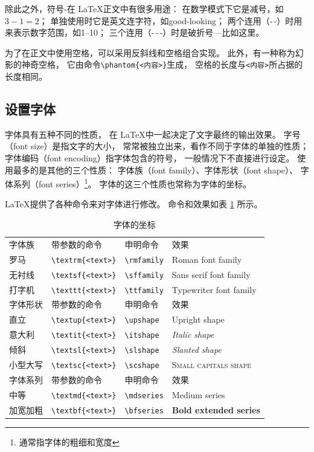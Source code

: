 \documentclass{ctexart}
\numberwithin{equation}{section}			%
\begin{document}
	除此之外，符号-在 \LaTeX 正文中有很多用途：
	在数学模式下它是减号，如$3-1=2$；
	单独使用时它是英文连字符，如good-looking；
	两个连用（-\,-）时用来表示数字范围，如1--10；
	三个连用（-\,-\,-）时是破折号---比如这里。
	
	为了在正文中使用空格，可以采用反斜线和空格组合实现。
	此外，有一种称为幻影的神奇空格，
	它由命令\verb|\phantom{<内容>}|生成，
	空格的长度与\verb|<内容>|所占据的长度相同。
	
	\subsection{设置字体}
	字体具有五种不同的性质，
	在 \LaTeX 中一起决定了文字最终的输出效果。
	字号（font size）是指文字的大小，
	常常被独立出来，看作不同于字体的单独的性质；
	字体编码（font encoding）指字体包含的符号，
	一般情况下不直接进行设定。
	使用最多的是其他的三个性质：
	字体族（font family）、字体形状（font shape）、
	字体系列（font series）\footnote{通常指字体的粗细和宽度}。
	字体的这三个性质也常称为字体的坐标。
	
	\LaTeX 提供了各种命令来对字体进行修改。
	命令和效果如表 \ref{tab:fontcoord} 所示。
	
	\begin{table}
		\centering
		\caption{字体的坐标}
		\label{tab:fontcoord}
		\begin{tabular}{llll}
			\toprule
			字体族 & 带参数的命令 & 申明命令 & 效果 \\
			罗马 & \verb|\textrm{<text>}| & \verb|\rmfamily|
			    & \rmfamily Roman font family \\
			无衬线 & \verb|\textsf{<text>}| & \verb|\sffamily|
			    & \sffamily Sans serif font family \\
			打字机 & \verb|\texttt{<text>}| & \verb|\ttfamily|
			    & \ttfamily Typewriter font family \\
			\midrule
			字体形状 & 带参数的命令 & 申明命令 & 效果 \\
			直立 & \verb|\textup{<text>}| & \verb|\upshape|
			    & \upshape Upright shape \\
			意大利 & \verb|\textit{<text>}| & \verb|\itshape|
				& \itshape Italic shape \\
			倾斜& \verb|\textsl{<text>}| & \verb|\slshape|
				& \slshape Slanted shape \\
			小型大写 & \verb|\textsc{<text>}| & \verb|\scshape|
				& \scshape Small capitals shape \\
			\midrule
			字体系列 & 带参数的命令 & 申明命令 & 效果 \\
			中等 & \verb|\textmd{<text>}| & \verb|\mdseries|
				& \mdseries Medium series \\
			加宽加粗 & \verb|\textbf{<text>}| & \verb|\bfseries|
				& \bfseries Bold extended series \\
			\bottomrule
		\end{tabular}
	\end{table}
\end{document}
